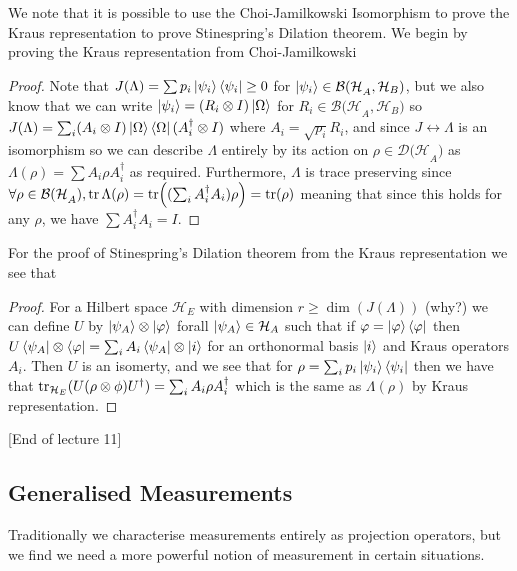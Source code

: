 \documentclass{article}
\theoremstyle{definition}
\begin{document}
We note that it is possible to use the Choi-Jamilkowski Isomorphism to prove
the Kraus representation to prove Stinespring's Dilation theorem. We begin by
proving the Kraus representation from Choi-Jamilkowski
\begin{proof}
\item Note that $J(\Lambda) = \sum p_i \ket{\psi_i} \bra{\psi_i} \geq 0$ for
  $\ket{\psi_i} \in \mathcal{B(H}_A, \mathcal{H}_B)$, but we also know that we
  can write $\ket{\psi_i} = (R_i \otimes I) \ket\Omega$ for $R_i \in 
  \mathcal{B(H}_A, \mathcal H_B)$ so $J(\Lambda) = \sum_i (A_i \otimes I) \ket
  \Omega \bra\Omega (A_i^\dagger \otimes I)$ where $A_i = \sqrt{p_i} R_i$, and
  since $J \leftrightarrow \Lambda$ is an isomorphism so we can describe 
  $\Lambda$ entirely by its action on $\rho \in \mathcal{D(H}_A)$ as $\Lambda
  (\rho) = \sum A_i \rho A_i^\dagger$ as required. Furthermore, $\Lambda$ is
  trace preserving since $\forall \rho \in \mathcal{B(H}_A), \tr \Lambda(\rho)
  = \tr((\sum_i A_i^\dagger A_i) \rho) = \tr(\rho)$ meaning that since this holds
  for any $\rho$, we have $\sum A_i^\dagger A_i = I$. 
\end{proof}

For the proof of Stinespring's Dilation theorem from the Kraus representation
we see that
\begin{proof}
  For a Hilbert space $\mathcal H_E$ with dimension $r \geq \dim(J(\Lambda))$ 
  (why?) we can define $U$ by $\ket{\psi_A} \otimes \ket \varphi$ forall 
  $\ket{\psi_A} \in \mathcal H_A$ such that if $\varphi = \ket \varphi \bra
  \varphi$ then $U \bra{\psi_A} \otimes \bra \varphi = \sum_i A_i \bra{\psi_A}
  \otimes \ket i$ for an orthonormal basis $\ket i$ and Kraus operators $A_i$. 
  Then $U$ is an isomerty, and we see that for $\rho = \sum_i p_i \ket{\psi_i}
  \bra{\psi_i}$ then we have that $\tr_{\mathcal H_E}(U(\rho \otimes \phi) 
  U^\dagger) = \sum_i A_i \rho A_i^\dagger$ which is the same as $\Lambda(
  \rho)$ by Kraus representation.
\end{proof}

[End of lecture 11]

\subsection{Generalised Measurements}

Traditionally we characterise measurements entirely as projection operators,
but we find we need a more powerful notion of measurement in certain 
situations.
\end{document}

